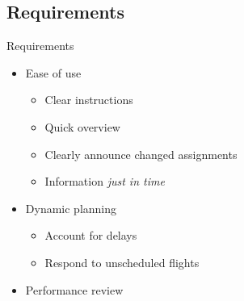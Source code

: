 \subsection{Requirements}
\begin{frame}{Requirements}{}
	\begin{itemize}
		\item Ease of use
		\begin{itemize}
			\item Clear instructions
			\item Quick overview
			\item Clearly announce changed assignments
			\item Information \textit{just in time}
		\end{itemize}
		\item Dynamic planning
		\begin{itemize}
			\item Account for delays
			\item Respond to unscheduled flights
		\end{itemize}
		\item Performance review
	\end{itemize}
\end{frame}